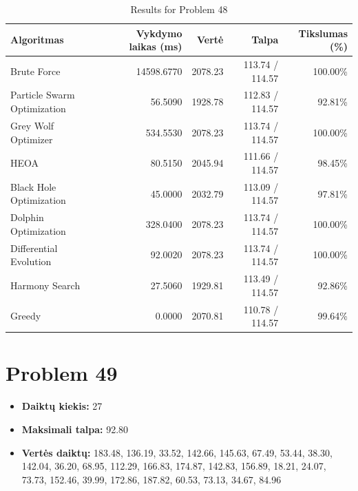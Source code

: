 \documentclass[a4paper,11pt]{article}
\begin{document}
\begin{table}[h!]
\centering
\begin{tabular}{lrrrr}
\toprule
\textbf{Algoritmas} & \textbf{Vykdymo laikas (ms)} & \textbf{Vertė} & \textbf{Talpa} & \textbf{Tikslumas (\%)} \\
\midrule
Brute Force & 14598.6770 & 2078.23 & 113.74 / 114.57 & 100.00\% \\
Particle Swarm Optimization & 56.5090 & 1928.78 & 112.83 / 114.57 & 92.81\% \\
Grey Wolf Optimizer & 534.5530 & 2078.23 & 113.74 / 114.57 & 100.00\% \\
HEOA & 80.5150 & 2045.94 & 111.66 / 114.57 & 98.45\% \\
Black Hole Optimization & 45.0000 & 2032.79 & 113.09 / 114.57 & 97.81\% \\
Dolphin Optimization & 328.0400 & 2078.23 & 113.74 / 114.57 & 100.00\% \\
Differential Evolution & 92.0020 & 2078.23 & 113.74 / 114.57 & 100.00\% \\
Harmony Search & 27.5060 & 1929.81 & 113.49 / 114.57 & 92.86\% \\
Greedy & 0.0000 & 2070.81 & 110.78 / 114.57 & 99.64\% \\
\bottomrule
\end{tabular}
\caption{Results for Problem 48}
\end{table}
\clearpage

\section*{Problem 49}
\begin{itemize}
    \item \textbf{Daiktų kiekis:} 27
    \item \textbf{Maksimali talpa:} 92.80
    \item \textbf{Vertės daiktų:} 183.48, 136.19, 33.52, 142.66, 145.63, 67.49, 53.44, 38.30, 142.04, 36.20, 68.95, 112.29, 166.83, 174.87, 142.83, 156.89, 18.21, 24.07, 73.73, 152.46, 39.99, 172.86, 187.82, 60.53, 73.13, 34.67, 84.96
\end{itemize}
\end{document}
